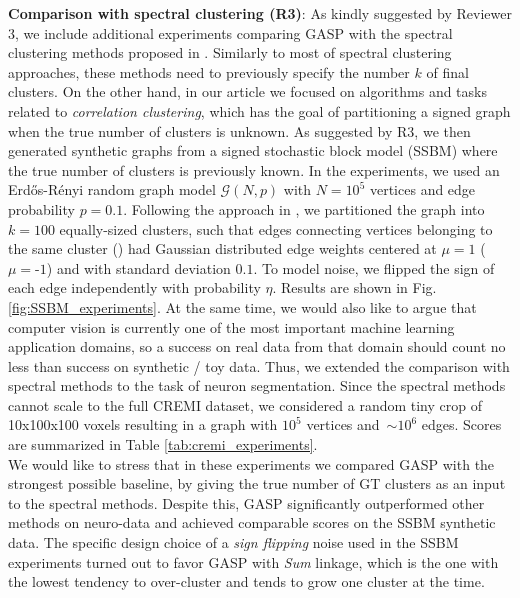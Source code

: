 \documentclass{article}
\newcommand\TODO[1]{{\color{red}{TODO: #1}}}
\newcommand\UPDATE[1]{{\color{blue}{#1}}}
\begin{document}
\textbf{Comparison with spectral clustering (R3)}: 
As kindly suggested by Reviewer 3, we include additional experiments comparing GASP with the spectral clustering methods proposed in \cite{Cucuringu2019SPONGEAG,chiang2012scalable,kunegis2010spectral}. 
Similarly to most of spectral clustering approaches, these methods need to previously specify the number $k$ of final clusters. %
On the other hand, in our article we focused on algorithms and tasks related to \emph{correlation clustering}, which has the goal of partitioning a signed graph when the true number of clusters is unknown. 
As suggested by R3, we then generated synthetic graphs from a signed stochastic block model (SSBM) where the true number of clusters is previously known. In the experiments, we used an Erd\H os-R\'enyi random graph model $\mathcal{G}(N,p)$ with $N=10^5$ vertices and edge probability $p=0.1$. Following the approach in \cite{Cucuringu2019SPONGEAG}, we partitioned the graph into $k=100$ equally-sized clusters, such that edges connecting vertices belonging to the same cluster (\UPDATE{different clusters}) had Gaussian distributed edge weights centered at $\mu=1$ ($\mu=$-$1$) and with standard deviation $0.1$. To model noise, we flipped the sign of each edge independently with probability $\eta$. Results are shown in Fig. \ref{fig:SSBM_experiments}.
At the same time, we would also like to argue that computer vision is currently one of the most important machine learning application domains, so a success on real data from that domain should count no less than success on synthetic / toy data.
Thus, we extended the comparison with spectral methods to the task of neuron segmentation. Since the spectral methods cannot scale to the full CREMI dataset, we considered a random tiny crop of 10x100x100 voxels resulting in a graph with $10^5$ vertices and~$\sim10^6$ edges. Scores are summarized in Table \ref{tab:cremi_experiments}.\\
We would like to stress that in these experiments we compared GASP with the strongest possible baseline, by giving the true number of GT clusters as an input to the spectral methods. Despite this, GASP significantly outperformed other methods on neuro-data and achieved comparable scores on the SSBM synthetic data. The specific design choice of a \emph{sign flipping} noise used in the SSBM experiments turned out to favor GASP with \emph{Sum} linkage, which is the one with the lowest tendency to over-cluster and tends to grow one cluster at the time. \TODO{More?}
\end{document}
